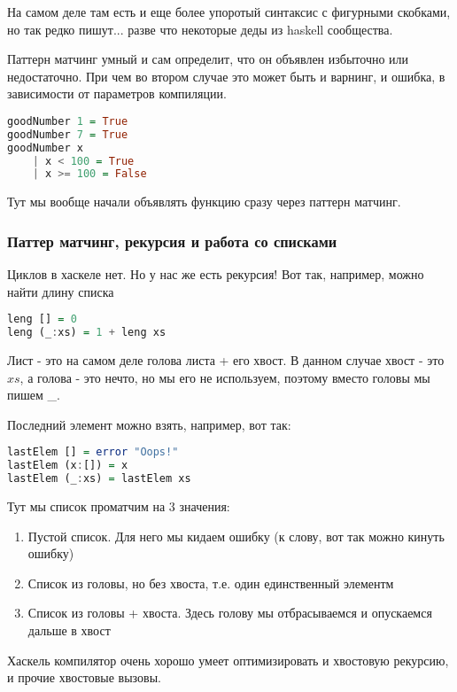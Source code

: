 \documentclass[10pt, a4paper]{article}
\begin{document}
На самом деле там есть и еще более упоротый синтаксис с фигурными скобками, но так редко пишут... разве что некоторые деды из haskell сообщества.

Паттерн матчинг умный и сам определит, что он объявлен избыточно или недостаточно. При чем во втором случае это может быть и варнинг, и ошибка, в зависимости от параметров компиляции.

\begin{lstlisting}[language=haskell]
goodNumber 1 = True
goodNumber 7 = True
goodNumber x 
    | x < 100 = True
    | x >= 100 = False 
\end{lstlisting}

Тут мы вообще начали объявлять функцию сразу через паттерн матчинг.

\subsubsection{Паттер матчинг, рекурсия и работа со списками}
Циклов в хаскеле нет. Но у нас же есть рекурсия! Вот так, например, можно найти длину списка
\begin{lstlisting}[language=haskell]
leng [] = 0
leng (_:xs) = 1 + leng xs 
\end{lstlisting}

Лист - это на самом деле голова листа + его хвост. В данном случае хвост - это $xs$, а голова - это нечто, но мы его не используем, поэтому вместо головы мы пишем \_.

Последний элемент можно взять, например, вот так:
\begin{lstlisting}[language=haskell]
lastElem [] = error "Oops!"
lastElem (x:[]) = x
lastElem (_:xs) = lastElem xs
\end{lstlisting}

Тут мы список проматчим на 3 значения:
\begin{enumerate}
	\item Пустой список. Для него мы кидаем ошибку (к слову, вот так можно кинуть ошибку)
	\item Список из головы, но без хвоста, т.е. один единственный элементм
	\item Список из головы + хвоста. Здесь голову мы отбрасываемся и опускаемся дальше в хвост
\end{enumerate}

Хаскель компилятор очень хорошо умеет оптимизировать и хвостовую рекурсию, и прочие хвостовые вызовы.
\end{document}
